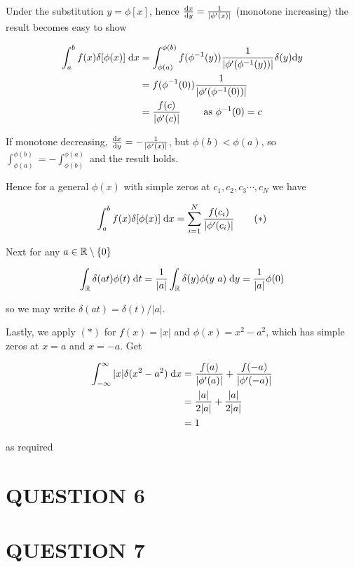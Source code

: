 \documentclass[a4paper]{article}
\begin{document}
Under the substitution $ y = \phi[x] $, hence $ \frac{\mathrm{d} x}{\mathrm{d} y} =  \frac{1}{| \phi'(x) |} $ (monotone increasing) the result becomes easy to show

\begin{align*}
\int_{a}^{b} f(x) \delta[\phi(x)]  \; \mathrm{d} x & = \int_{\phi(a)}^{\phi(b)} f(\phi^{-1}(y)) \frac{1}{| \phi'(\phi^{-1}(y)) |} \delta(y) \mathrm{d} y \\
& = f(\phi^{-1}(0)) \frac{1}{| \phi'(\phi^{-1}(0)) |} \\
& = \frac{f(c)}{| \phi'(c) |} \qquad \text{ as } \phi^{-1}(0) = c
\end{align*}

If monotone decreasing, $ \frac{\mathrm{d} x}{\mathrm{d} y} =  - \frac{1}{| \phi'(x) |} $, but $ \phi(b) < \phi(a) $, so $ \int_{\phi(a)}^{\phi(b)} = - \int_{\phi(b)}^{\phi(a)} $ and the result holds.

Hence for a general $ \phi(x) $ with simple zeros at $ c_{1},c_{2},c_{3}\cdots,c_{N} $ we have

\[ \int_{a}^{b} f(x) \delta[\phi(x)]  \; \mathrm{d} x = \sum_{i=1}^{N}  \frac{f(c_{i})}{| \phi'(c_{i}) |} \qquad (*) \]

Next for any $ a \in \mathbb{R} \setminus \{0 \} $

\[ \int_{\mathbb{R}} \delta(at) \phi(t) \; \mathrm{d} t = \frac{1}{| a |} \int_{\mathbb{R}}  \delta(y) \phi (y \ a) \; \mathrm{d} y = \frac{1}{| a |} \phi(0) \]

so we may write $ \delta(at) = \delta(t) / | a | $.

Lastly, we apply $ (*) $ for $ f(x) = | x | $ and $ \phi(x) = x^{2} - a^{2} $, which has simple zeros at $ x = a $ and $ x = -a $. Get


\begin{align*}
\int_{-\infty}^{\infty} | x | \delta( x^{2} - a^{2} ) \; \mathrm{d} x & = \frac{f(a)}{| \phi'(a) |} + \frac{f(-a)}{| \phi'(-a) |} \\
& = \frac{| a |}{2|  a |} + \frac{| a |}{2| a |} \\
& = 1
\end{align*}

as required





\section{QUESTION 6}
\section{QUESTION 7}
\end{document}
